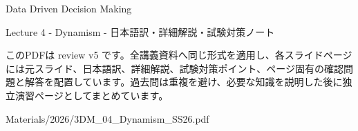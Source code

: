 \documentclass[a4paper,landscape,9pt]{article}
\begin{document}
\begin{titlepage}
\centering
\vspace*{2cm}
{\Huge Data Driven Decision Making\par}
\vspace{0.5cm}
{\Large Lecture 4 - Dynamism - 日本語訳・詳細解説・試験対策ノート\par}
\vspace{1cm}
\begin{minipage}{0.82\textwidth}
このPDFは review v5 です。全講義資料へ同じ形式を適用し、各スライドページには元スライド、日本語訳、詳細解説、試験対策ポイント、ページ固有の確認問題と解答を配置しています。過去問は重複を避け、必要な知識を説明した後に独立演習ページとしてまとめています。
\end{minipage}
\vfill
{\large Materials/2026/3DM\_04\_Dynamism\_SS26.pdf}
\end{titlepage}
\tableofcontents
\clearpage

\end{document}
